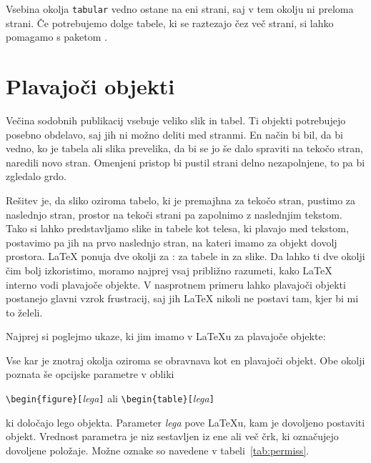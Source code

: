 Vsebina okolja \texttt{tabular} vedno ostane na eni strani, saj v tem okolju ni preloma strani. 
Če potrebujemo dolge tabele, ki se raztezajo čez več strani, si lahko pomagamo s paketom 
.

\section{Plavajoči objekti}
Večina sodobnih publikacij vsebuje veliko slik in tabel. Ti objekti potrebujejo 
posebno obdelavo, saj jih ni možno deliti med stranmi. En način bi bil, da bi vedno, ko je tabela ali slika
prevelika, da bi se jo še dalo spraviti na tekočo stran, naredili novo stran. Omenjeni pristop bi pustil 
strani delno nezapolnjene, to pa bi zgledalo grdo.

Rešitev je, da sliko oziroma tabelo, ki je premajhna za tekočo stran, pustimo za naslednjo stran,
prostor na tekoči strani pa zapolnimo z naslednjim tekstom. Tako si lahko predstavljamo slike in 
tabele kot telesa, ki plavajo med tekstom, postavimo pa jih na prvo naslednjo stran, na kateri 
imamo za objekt dovolj prostora.
\LaTeX{} ponuja dve okolji za :  za tabele in  za slike.
Da lahko ti dve okolji čim bolj izkoristimo, moramo najprej vsaj približno razumeti, kako \LaTeX{} interno 
vodi plavajoče objekte. V nasprotnem primeru lahko plavajoči objekti postanejo glavni vzrok
frustracij, saj jih \LaTeX{} nikoli ne postavi tam, kjer bi mi to želeli.

\bigskip
Najprej si poglejmo ukaze, ki jim imamo v \LaTeX{}u za plavajoče objekte:

Vse kar je znotraj okolja  oziroma  se obravnava kot en plavajoči objekt.
Obe okolji poznata še opcijske parametre v obliki
\begin{lscommand}
\verb|\begin{figure}[|\emph{lega}\verb|]| ali
\verb|\begin{table}[|\emph{lega}\verb|]|
\end{lscommand}
\noindent ki določajo lego objekta. Parameter \emph{lega} pove \LaTeX{}u, kam je 
dovoljeno postaviti objekt. Vrednost parametra je niz sestavljen iz ene ali več črk, ki označujejo 
dovoljene položaje. Možne oznake so navedene v tabeli~\ref{tab:permiss}.

